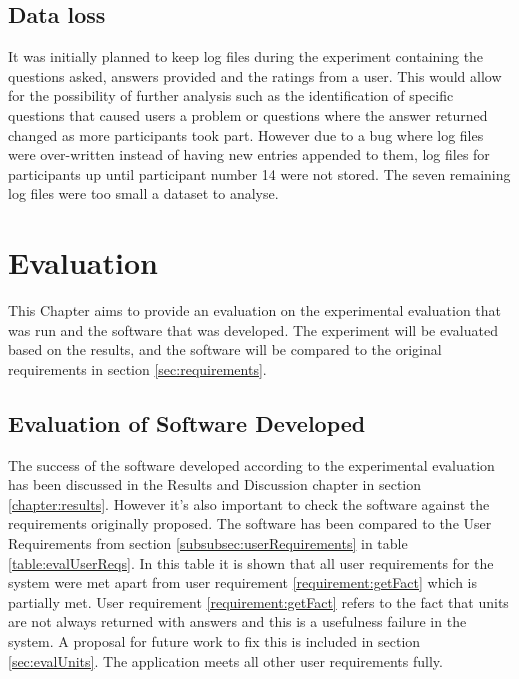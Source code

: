\documentclass[authoryearcitations]{UoYCSproject}
\begin{document}
\section{Data loss}
\label{sec:dataLoss}

It was initially planned to keep log files during the experiment containing the questions asked, answers provided and the ratings from a user. This would allow for the possibility of further analysis such as the identification of specific questions that caused users a problem or questions where the answer returned changed as more participants took part. However due to a bug where log files were over-written instead of having new entries appended to them, log files for participants up until participant number 14 were not stored. The seven remaining log files were too small a dataset to analyse.

\newpage

\newpage
\chapter{Evaluation}
\label{sec:evaluation}

This Chapter aims to provide an evaluation on the experimental evaluation that was run and the software that was developed. The experiment will be evaluated based on the results, and the software will be compared to the original requirements in section \ref{sec:requirements}.

\section{Evaluation of Software Developed}
\label{sec:evalSoftwareDeveloped}

The success of the software developed according to the experimental evaluation has been discussed in the Results and Discussion chapter in section \ref{chapter:results}. However it's also important to check the software against the requirements originally proposed. The software has been compared to the User Requirements from section \ref{subsubsec:userRequirements} in table \ref{table:evalUserReqs}. In this table it is shown that all user requirements for the system were met apart from user requirement \ref{requirement:getFact} which is partially met. User requirement \ref{requirement:getFact} refers to the fact that units are not always returned with answers and this is a usefulness failure in the system. A proposal for future work to fix this is included in section \ref{sec:evalUnits}. The application meets all other user requirements fully.
\end{document}
